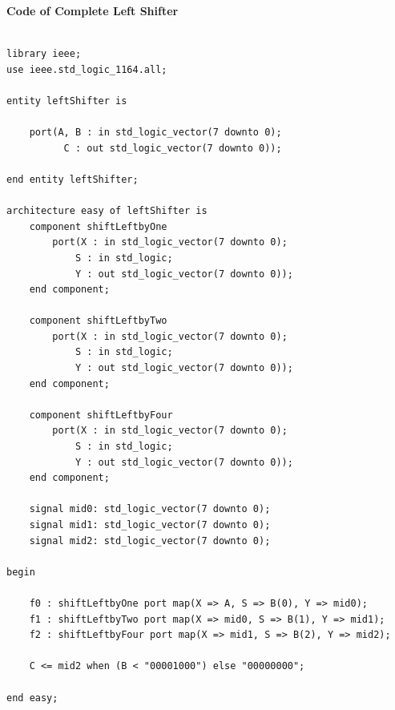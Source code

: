 \documentclass[12pt]{article}
\begin{document}
        \noindent
        \textbf{Code of Complete Left Shifter}
        \noindent
        \begin{verbatim}

library ieee;
use ieee.std_logic_1164.all;

entity leftShifter is

	port(A, B : in std_logic_vector(7 downto 0);
		  C : out std_logic_vector(7 downto 0));
		  
end entity leftShifter;

architecture easy of leftShifter is
	component shiftLeftbyOne
		port(X : in std_logic_vector(7 downto 0);
		 	S : in std_logic;
		  	Y : out std_logic_vector(7 downto 0));
	end component;

	component shiftLeftbyTwo
		port(X : in std_logic_vector(7 downto 0);
		 	S : in std_logic;
		  	Y : out std_logic_vector(7 downto 0));
	end component;

	component shiftLeftbyFour
		port(X : in std_logic_vector(7 downto 0);
		 	S : in std_logic;
		  	Y : out std_logic_vector(7 downto 0));
	end component;

	signal mid0: std_logic_vector(7 downto 0);
	signal mid1: std_logic_vector(7 downto 0);
	signal mid2: std_logic_vector(7 downto 0);

begin

	f0 : shiftLeftbyOne port map(X => A, S => B(0), Y => mid0);
	f1 : shiftLeftbyTwo port map(X => mid0, S => B(1), Y => mid1);
	f2 : shiftLeftbyFour port map(X => mid1, S => B(2), Y => mid2);

	C <= mid2 when (B < "00001000") else "00000000";

end easy;
        \end{verbatim}

    \newpage
\end{document}
